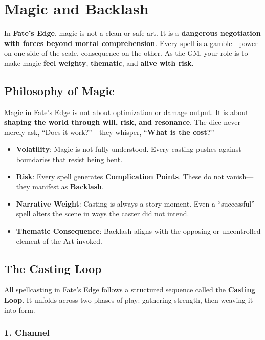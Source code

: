\chapter{Magic and Backlash}

In \textbf{Fate’s Edge}, magic is not a clean or safe art. It is a \textbf{dangerous negotiation with forces beyond mortal comprehension}. Every spell is a gamble—power on one side of the scale, consequence on the other. As the GM, your role is to make magic \textbf{feel weighty}, \textbf{thematic}, and \textbf{alive with risk}.

\section*{Philosophy of Magic}

Magic in Fate’s Edge is not about optimization or damage output. It is about \textbf{shaping the world through will, risk, and resonance}. The dice never merely ask, “Does it work?”—they whisper, “\textbf{What is the cost?}”

\begin{itemize}
    \item \textbf{Volatility}: Magic is not fully understood. Every casting pushes against boundaries that resist being bent.
    \item \textbf{Risk}: Every spell generates \textbf{Complication Points}. These do not vanish—they manifest as \textbf{Backlash}.
    \item \textbf{Narrative Weight}: Casting is always a story moment. Even a “successful” spell alters the scene in ways the caster did not intend.
    \item \textbf{Thematic Consequence}: Backlash aligns with the opposing or uncontrolled element of the Art invoked.
\end{itemize}

\section*{The Casting Loop}

All spellcasting in Fate’s Edge follows a structured sequence called the \textbf{Casting Loop}. It unfolds across two phases of play: gathering strength, then weaving it into form.

\subsection*{1. Channel}

